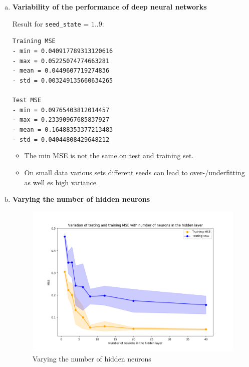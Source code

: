 \documentclass[12pt,a4paper]{article}
\begin{document}
\begin{enumerate}[a)]

  \item \textbf{Variability of the performance of deep neural networks}

Result for \texttt{seed\_state} = $1..9$:


\texttt{Training MSE \\
- min = 0.040917789313120616 \\
- max = 0.05225074774663281 \\
- mean = 0.0449607719274836 \\
- std = 0.003249135660634265 \\
\\
Test MSE \\
- min = 0.09765403812014457 \\
- max = 0.23390967685837927 \\
- mean = 0.16488353377213483 \\
- std = 0.04044808429648212\\
}

\begin{itemize}
  \item The min MSE is not the same on test and training set.
  \item On small data various sets different seeds can lead to
  over-/underfitting as well es high variance.
\end{itemize}

  \item \textbf{Varying the number of hidden neurons}
  
\begin{figure}[H]
	\centering
  \includegraphics[width=\textwidth]{figures/1_1_c.png}
	\caption{Varying the number of hidden neurons}
	\label{1_1_c}
\end{figure}


\end{enumerate}
\end{document}
